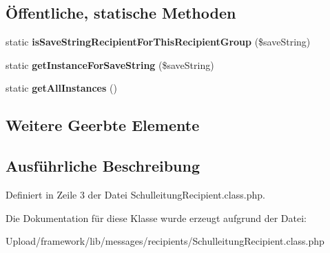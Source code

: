 \subsection*{Öffentliche, statische Methoden}
\begin{DoxyCompactItemize}
\item 
\mbox{\label{class_schulleitung_recipient_af9bbea6a75903a19d4faca78b50ccfe1}} 
static {\bfseries is\+Save\+String\+Recipient\+For\+This\+Recipient\+Group} (\$save\+String)
\item 
\mbox{\label{class_schulleitung_recipient_ab42c726e6f5ab2fec43af337a209d83f}} 
static {\bfseries get\+Instance\+For\+Save\+String} (\$save\+String)
\item 
\mbox{\label{class_schulleitung_recipient_ad95a3bcf42fe80c09226d60b1f6ffc21}} 
static {\bfseries get\+All\+Instances} ()
\end{DoxyCompactItemize}
\subsection*{Weitere Geerbte Elemente}


\subsection{Ausführliche Beschreibung}


Definiert in Zeile 3 der Datei Schulleitung\+Recipient.\+class.\+php.



Die Dokumentation für diese Klasse wurde erzeugt aufgrund der Datei\+:\begin{DoxyCompactItemize}
\item 
Upload/framework/lib/messages/recipients/Schulleitung\+Recipient.\+class.\+php\end{DoxyCompactItemize}
